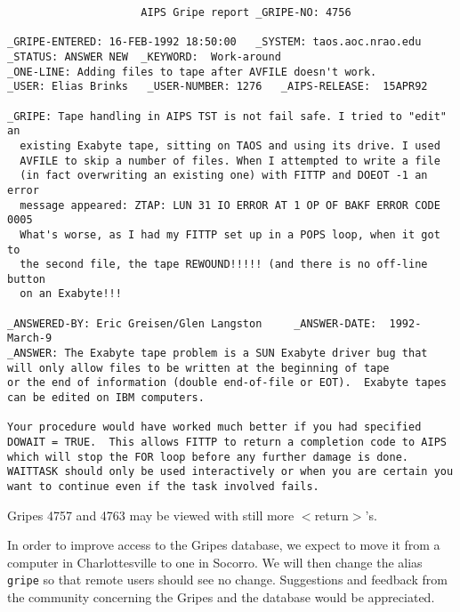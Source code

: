 \begin{center}
\begin{verbatim}
                     AIPS Gripe report _GRIPE-NO: 4756

_GRIPE-ENTERED: 16-FEB-1992 18:50:00   _SYSTEM: taos.aoc.nrao.edu
_STATUS: ANSWER NEW  _KEYWORD:  Work-around
_ONE-LINE: Adding files to tape after AVFILE doesn't work.
_USER: Elias Brinks   _USER-NUMBER: 1276   _AIPS-RELEASE:  15APR92

_GRIPE: Tape handling in AIPS TST is not fail safe. I tried to "edit" an
  existing Exabyte tape, sitting on TAOS and using its drive. I used
  AVFILE to skip a number of files. When I attempted to write a file
  (in fact overwriting an existing one) with FITTP and DOEOT -1 an error
  message appeared: ZTAP: LUN 31 IO ERROR AT 1 OP OF BAKF ERROR CODE 0005
  What's worse, as I had my FITTP set up in a POPS loop, when it got to
  the second file, the tape REWOUND!!!!! (and there is no off-line button
  on an Exabyte!!!

_ANSWERED-BY: Eric Greisen/Glen Langston     _ANSWER-DATE:  1992-March-9
_ANSWER: The Exabyte tape problem is a SUN Exabyte driver bug that
will only allow files to be written at the beginning of tape
or the end of information (double end-of-file or EOT).  Exabyte tapes
can be edited on IBM computers.

Your procedure would have worked much better if you had specified
DOWAIT = TRUE.  This allows FITTP to return a completion code to AIPS
which will stop the FOR loop before any further damage is done.
WAITTASK should only be used interactively or when you are certain you
want to continue even if the task involved fails.

\end{verbatim}
\end{center}

Gripes 4757 and 4763 may be viewed with still more $<$return$>$'s.

In order to improve access to the Gripes database, we expect to move
it from a computer in Charlottesville to one in Socorro.  We will then
change the alias {\tt gripe} so that remote users should see no
change.  Suggestions and feedback from the community concerning the
Gripes and the database would be appreciated.



